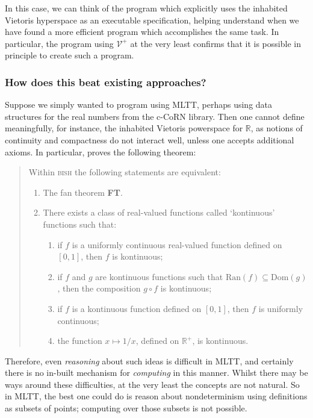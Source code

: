 \documentclass{article}           %
\newcommand{\R}{\mathbb{R}}
\newcommand{\Viet}{{\mathcal{V}^+}}
\begin{document}
In this case, we can think of the program which explicitly uses the inhabited Vietoris hyperspace as an executable specification, helping understand when we have found a more efficient program which accomplishes the same task. In particular, the program using $\Viet$ at the very least confirms that it is possible in principle to create such a program.

\subsubsection{How does this beat existing approaches?}

Suppose we simply wanted to program using MLTT, perhaps using data structures for the real numbers from the c-CoRN library. Then one cannot define meaningfully, for instance, the inhabited Vietoris powerspace for $\R$, as notions of continuity and compactness do not interact well, unless one accepts additional axioms. In particular, \cite{waaldijk} proves the following theorem:
\begin{quote}
Within \textsc{bish} the following statements are equivalent:
\begin{enumerate}
\item The fan theorem \textbf{FT}.
\item There exists a class of real-valued functions called `kontinuous' functions such that:
\begin{enumerate}
\item if $f$ is a uniformly continuous real-valued function defined on $[0, 1]$, then $f$ is kontinuous;
\item if $f$ and $g$ are kontinuous functions such that $\text{Ran}(f) \subseteq \text{Dom}(g)$, then the composition $g \circ f$ is kontinuous;
\item if $f$ is a kontinuous function defined on $[0, 1]$, then $f$ is
uniformly continuous;
\item the function $x \mapsto 1/x$, defined on $\R^+$, is kontinuous.
\end{enumerate}
\end{enumerate}
\end{quote}

Therefore, even \emph{reasoning} about such ideas is difficult in MLTT, and certainly there is no in-built mechanism for \emph{computing} in this manner. Whilst there may be ways around these difficulties, at the very least the concepts are not natural. So in MLTT, the best one could do is reason about nondeterminism using definitions as subsets of points; computing over those subsets is not possible.
\end{document}
